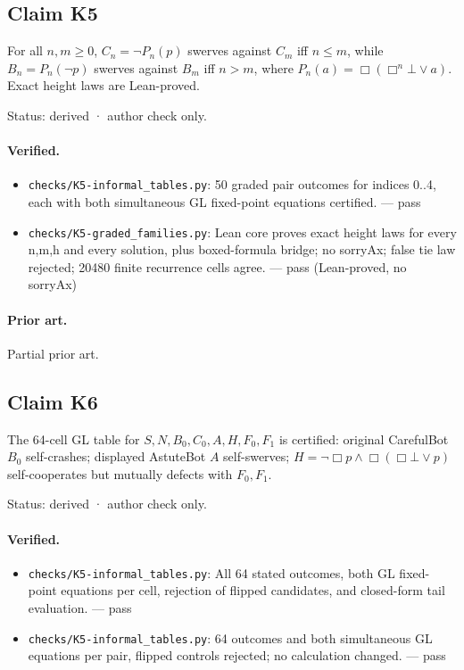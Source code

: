 \documentclass{article}
\begin{document}
\subsection*{Claim K5}

For all $n,m\ge0$, $C_n=\neg P_n(p)$ swerves against $C_m$ iff $n\le m$, while $B_n=P_n(\neg p)$ swerves against $B_m$ iff $n>m$, where $P_n(a)=\Box(\Box^n\bot\lor a)$. Exact height laws are Lean-proved.

Status: derived · author check only.

\paragraph{Verified.}
\begin{itemize}
\item \texttt{checks/K5-informal\_tables.py}: 50 graded pair outcomes for indices 0..4, each with both simultaneous GL fixed-point equations certified. --- pass
\item \texttt{checks/K5-graded\_families.py}: Lean core proves exact height laws for every n,m,h and every solution, plus boxed-formula bridge; no sorryAx; false tie law rejected; 20480 finite recurrence cells agree. --- pass (Lean-proved, no sorryAx)
\end{itemize}

\paragraph{Prior art.} Partial prior art.

\subsection*{Claim K6}

The 64-cell GL table for $S,N,B_0,C_0,A,H,F_0,F_1$ is certified: original CarefulBot $B_0$ self-crashes; displayed AstuteBot $A$ self-swerves; $H=\neg\Box p\land\Box(\Box\bot\lor p)$ self-cooperates but mutually defects with $F_0,F_1$.

Status: derived · author check only.

\paragraph{Verified.}
\begin{itemize}
\item \texttt{checks/K5-informal\_tables.py}: All 64 stated outcomes, both GL fixed-point equations per cell, rejection of flipped candidates, and closed-form tail evaluation. --- pass
\item \texttt{checks/K5-informal\_tables.py}: 64 outcomes and both simultaneous GL equations per pair, flipped controls rejected; no calculation changed. --- pass
\end{itemize}
\end{document}
